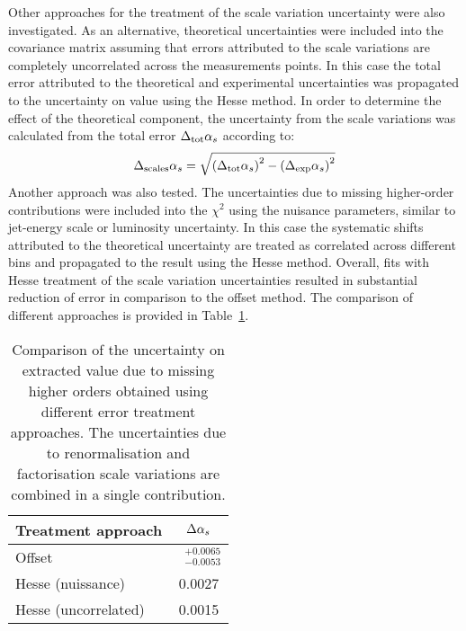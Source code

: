 Other approaches for the treatment of the scale variation uncertainty were also investigated. As an alternative, theoretical uncertainties were included into the covariance matrix assuming that errors attributed to the scale variations are completely uncorrelated across the measurements points. In this case the total error attributed to the theoretical and experimental uncertainties was propagated to the uncertainty on \asz value using the Hesse method. In order to determine the effect of the theoretical component, the uncertainty from the scale variations was calculated from the total error $\Delta_\text{tot}\mbox{$\alpha_{s}$}$ according to:
\begin{equation}
 \Delta_\text{scales}\mbox{$\alpha_{s}$} = \sqrt{\left(\Delta_\text{tot}\mbox{$\alpha_{s}$}\right)^2 - \left(\Delta_\text{exp}\mbox{$\alpha_{s}$}\right)^2}
\end{equation}
Another approach was also tested. The uncertainties due to missing higher-order contributions were included into the $\chi^2$ using the nuisance parameters, similar to jet-energy scale or luminosity uncertainty. In this case the systematic shifts attributed to the theoretical uncertainty are treated as correlated across different bins and propagated to the result using the Hesse method. Overall, fits with Hesse treatment of the scale variation uncertainties resulted in substantial reduction of \asz error in comparison to the offset method. The comparison of different approaches is provided in Table~\ref{tab:scaleuncvariants}.
\begin{table}[h]
\centering
\begin{tabular}{|l|c|}
 \hline
 Treatment approach & $\Delta\mbox{$\alpha_{s}$}$ \\
 \hline
 \hline
  Offset & $\phantom{x}^{+0.0065}_{-0.0053}$\\
  Hesse (nuissance) & 0.0027 \\
  Hesse (uncorrelated) & 0.0015 \\
 \hline
\end{tabular}
\caption{Comparison of the uncertainty on extracted \asz value due to missing higher orders obtained using different error treatment approaches. The uncertainties due to renormalisation and factorisation scale variations are combined in a single contribution.}
\label{tab:scaleuncvariants}
\end{table}

